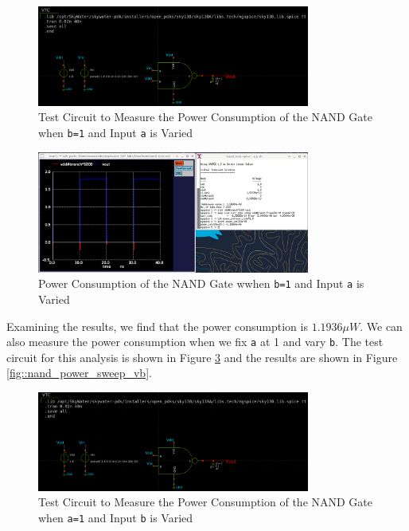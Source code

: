 \documentclass[fleqn]{article}
\begin{document}
	\begin{figure}[H]
		\centerline{\includegraphics[width=0.8\textwidth]{nand_power_test_sweep_va.png}}
		\caption{Test Circuit to Measure the Power Consumption of the NAND Gate when \texttt{b=1} and Input \texttt{a} is Varied}
		\label{fig::nand_power_test_sweep_va}
	\end{figure}
	
	\begin{figure}[H]
		\centerline{\includegraphics[width=0.8\textwidth]{nand_power_sweep_va.png}}
		\caption{Power Consumption of the NAND Gate wwhen \texttt{b=1} and Input \texttt{a} is Varied}
		\label{fig::nand_power_sweep_va}
	\end{figure}
	
	Examining the results, we find that the power consumption is $1.1936{\mu}W$. We can also measure the power consumption when we fix \texttt{a} at 1 and vary \texttt{b}. The test circuit for this analysis is shown in Figure \ref{fig::nand_power_test_sweep_vb} and the results are shown in Figure \ref{fig::nand_power_sweep_vb}.
	
	\begin{figure}[H]
		\centerline{\includegraphics[width=0.8\textwidth]{nand_power_test_sweep_vb.png}}
		\caption{Test Circuit to Measure the Power Consumption of the NAND Gate when \texttt{a=1} and Input \texttt{b} is Varied}
		\label{fig::nand_power_test_sweep_vb}
	\end{figure}
	
\end{document}
